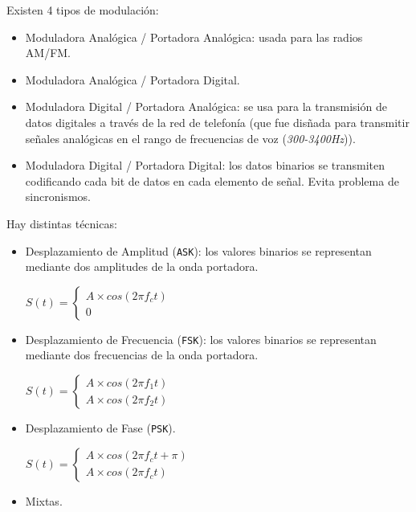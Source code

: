 \documentclass[]{article}
\begin{document}
Existen 4 tipos de modulación:
\begin{itemize}
    \item Moduladora Analógica / Portadora Analógica: usada para las radios AM/FM.
    \item Moduladora Analógica / Portadora Digital.
    \item Moduladora Digital / Portadora Analógica: se usa para la transmisión de datos digitales a través de la red de telefonía (que fue disñada para transmitir señales analógicas en el rango de frecuencias de voz (\emph{300-3400Hz})).
    \item Moduladora Digital / Portadora Digital: los datos binarios se transmiten codificando cada bit de datos en cada elemento de señal. Evita problema de sincronismos.
\end{itemize}


Hay distintas técnicas:
\begin{itemize}
    \item Desplazamiento de Amplitud (\texttt{ASK}): los valores binarios se representan mediante dos amplitudes de la onda portadora.
    \begin{center}
        $S(t) = \begin{cases}
                    A\times cos(2\pi f_c t)\\
                    0
                \end{cases}$
    \end{center}


    \item Desplazamiento de Frecuencia (\texttt{FSK}): los valores binarios se representan mediante dos frecuencias de la onda portadora.
     \begin{center}
        $S(t) = \begin{cases}
                    A\times cos(2\pi f_1 t)\\
                    A\times cos(2\pi f_2 t)
                \end{cases}$
    \end{center}

    \item Desplazamiento de Fase (\texttt{PSK}).
    \begin{center}
        $S(t) = \begin{cases}
                    A\times cos(2\pi f_c t + \pi)\\
                    A\times cos(2\pi f_c t)
                \end{cases}$
    \end{center}
    \item Mixtas.
\end{itemize}
\end{document}
